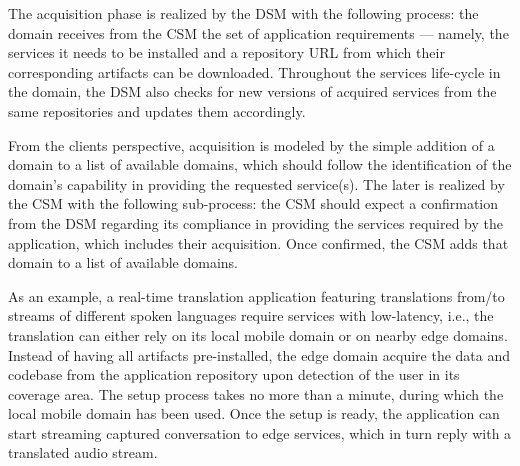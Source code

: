 The acquisition phase is realized by the DSM with the following process: the domain receives from the CSM the set of application requirements --- namely, the services it needs to be installed and a repository URL from which their corresponding artifacts can be downloaded. Throughout the services life-cycle in the domain, the DSM also checks for new versions of acquired services from the same repositories and updates them accordingly. 


From the clients perspective, acquisition is modeled by the simple addition of a domain to a list of available domains, which should follow the identification of the domain's capability in providing the requested service(s). The later is realized by the CSM with the following sub-process: the CSM should expect a confirmation from the DSM regarding its compliance in providing the services required by the application, which includes their acquisition. Once confirmed, the CSM adds that domain to a list of available domains. 

As an example, a real-time translation application featuring translations from/to streams of different spoken languages require services with low-latency, i.e., the translation can either rely on its local mobile domain or on nearby edge domains. Instead of having all artifacts pre-installed, the edge domain acquire the data and codebase from the application repository upon detection of the user in its coverage area. The setup process takes no more than a minute, during which the local mobile domain has been used. Once the setup is ready, the application can start streaming captured conversation to edge services, which in turn reply with a translated audio stream.





